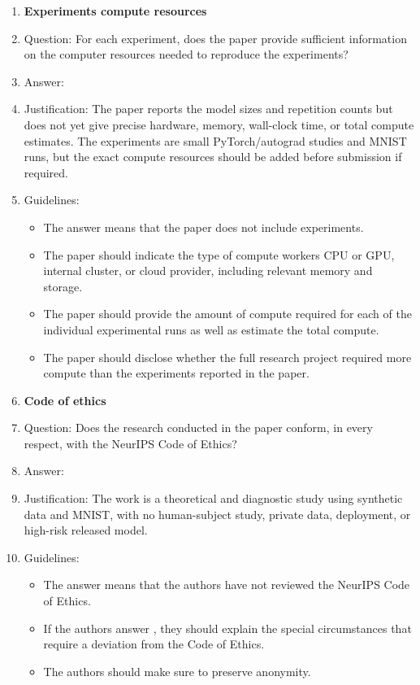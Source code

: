 \documentclass{article}
\begin{document}
\begin{enumerate}[leftmargin=1.5em]
\item {\bf Experiments compute resources}
    \item[] Question: For each experiment, does the paper provide sufficient information on the computer resources needed to reproduce the experiments?
    \item[] Answer: \answerNo{}
    \item[] Justification: The paper reports the model sizes and repetition counts but does not yet give precise hardware, memory, wall-clock time, or total compute estimates. The experiments are small PyTorch/autograd studies and MNIST runs, but the exact compute resources should be added before submission if required.
    \item[] Guidelines:
    \begin{itemize}
        \item The answer \answerNA{} means that the paper does not include experiments.
        \item The paper should indicate the type of compute workers CPU or GPU, internal cluster, or cloud provider, including relevant memory and storage.
        \item The paper should provide the amount of compute required for each of the individual experimental runs as well as estimate the total compute.
        \item The paper should disclose whether the full research project required more compute than the experiments reported in the paper.
    \end{itemize}

\item {\bf Code of ethics}
    \item[] Question: Does the research conducted in the paper conform, in every respect, with the NeurIPS Code of Ethics?
    \item[] Answer: \answerYes{}
    \item[] Justification: The work is a theoretical and diagnostic study using synthetic data and MNIST, with no human-subject study, private data, deployment, or high-risk released model.
    \item[] Guidelines:
    \begin{itemize}
        \item The answer \answerNA{} means that the authors have not reviewed the NeurIPS Code of Ethics.
        \item If the authors answer \answerNo{}, they should explain the special circumstances that require a deviation from the Code of Ethics.
        \item The authors should make sure to preserve anonymity.
    \end{itemize}


\end{enumerate}
\end{document}
